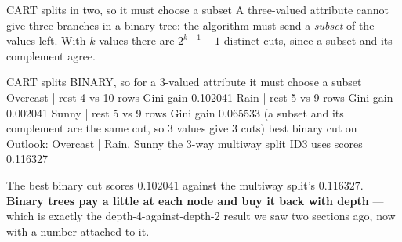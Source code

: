 \documentclass[aspectratio=169]{beamer}
\begin{document}
\begin{frame}[fragile,shrink=8]{CART splits in two, so it must choose a subset}
A three-valued attribute cannot give three branches in a binary tree: the
algorithm must send a \emph{subset} of the values left. With $k$ values there
are $2^{k-1}-1$ distinct cuts, since a subset and its complement agree.
\begin{outblk}
CART splits BINARY, so for a 3-valued attribute it must choose a subset
   {Overcast        } | rest    4 vs 10 rows   Gini gain 0.102041
   {Rain            } | rest    5 vs  9 rows   Gini gain 0.002041
   {Sunny           } | rest    5 vs  9 rows   Gini gain 0.065533
   (a subset and its complement are the same cut, so 3 values give 3 cuts)
   best binary cut on Outlook: {Overcast} | {Rain, Sunny}
   the 3-way multiway split ID3 uses scores 0.116327
\end{outblk}
\begin{center}\small
  The best binary cut scores $0.102041$ against the multiway split's
  $0.116327$. \textbf{Binary trees pay a little at each node and buy it back
  with depth} --- which is exactly the depth-4-against-depth-2 result we saw
  two sections ago, now with a number attached to it.
\end{center}
\end{frame}
\end{document}

